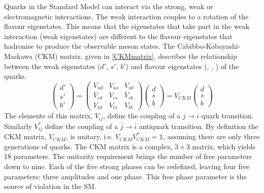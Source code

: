 Quarks in the Standard Model can interact via the strong, weak or electromagnetic interactions. The weak interaction couples to a rotation of the flavour eigenstates.
This means that the eigenstates that take part in the weak interaction (weak eigenstates) are different to the flavour eigenstates that hadronise to produce the observable meson states. The Cabibbo-Kobayashi-Maskawa (CKM) matrix, given in \eqn \ref{CKMmatrix}, describes the relationship between the weak eigenstates ($d'$, $s'$, $b'$) and flavour eigenstates (\dquark, \squark, \bquark) of the quarks. 
\begin{equation}
\left(
\begin{array}{c} d' \\ s' \\ b'  \end{array} \right) =
\begin{pmatrix} V_{ud} & V_{us} & V_{ub} \\ V_{cd} & V_{cs} & V_{cb} \\ V_{td} & V_{ts} & V_{tb} \end{pmatrix} \left( 
\begin{array}{c} d \\ s \\ b \end{array} \right) =
V_{CKM} \left( \begin{array}{c} d \\ s \\ b \end{array} \right)
\label{CKMmatrix}
\end{equation}
The elements of this matrix, $V_{ij}$, define the coupling of a $j \to i$ quark transition. Similarly $V_{ij}^*$ define the coupling of a $\bar{j} \to \bar{i}$ antiquark transition. By definition the CKM matrix, $V_{CKM}$, is unitary, i.e. $V_{CKM}V_{CKM}^* = \mathds{1}$, assuming there are only three generations of quarks. The CKM matrix is a complex, $3 \times 3$ matrix, which yields 18 parameters. The unitarity requirement brings the number of free parameters down to nine. Each of the five strong phases can be redefined, leaving four free parameters: three amplitudes and one phase. This free phase parameter is the source of \CP violation in the SM.

